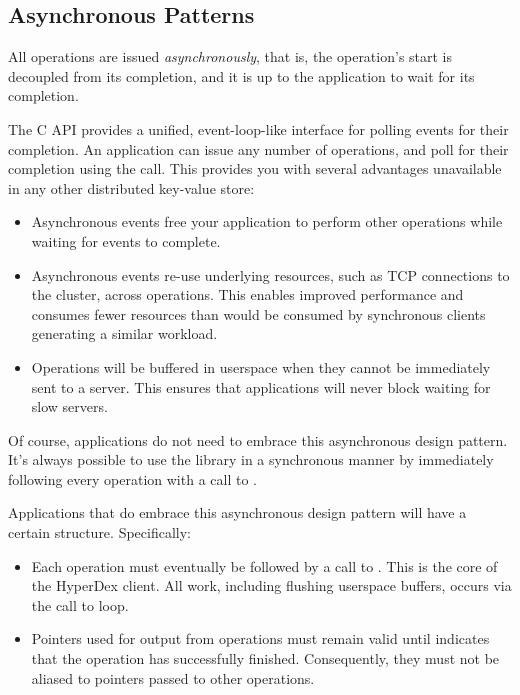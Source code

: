 \subsection{Asynchronous Patterns}

All operations are issued {\em asynchronously}, that is, the operation's start
is decoupled from its completion, and it is up to the application to wait for
its completion.

The C API provides a unified, event-loop-like interface for polling events for
their completion.  An application can issue any number of operations, and poll
for their completion using the  call.  This
provides you with several advantages unavailable in any other distributed
key-value store:

\begin{itemize}
\item Asynchronous events free your application to perform other operations
while waiting for events to complete.

\item Asynchronous events re-use underlying resources, such as TCP connections
to the cluster, across operations.  This enables improved performance and
consumes fewer resources than would be consumed by synchronous clients
generating a similar workload.

\item Operations will be buffered in userspace when they cannot be immediately
sent to a server.  This ensures that applications will never block waiting for
slow servers.
\end{itemize}

Of course, applications do not need to embrace this asynchronous design pattern.
It's always possible to use the library in a synchronous manner by immediately
following every operation with a call to .

Applications that do embrace this asynchronous design pattern will have a
certain structure.  Specifically:

\begin{itemize}
\item Each operation must eventually be followed by a call to
.  This is the core of the HyperDex client.  All
work, including flushing userspace buffers, occurs via the call to loop.

\item Pointers used for output from operations must remain valid until
 indicates that the operation has successfully
finished.  Consequently, they must not be aliased to pointers passed to other
operations.
\end{itemize}


